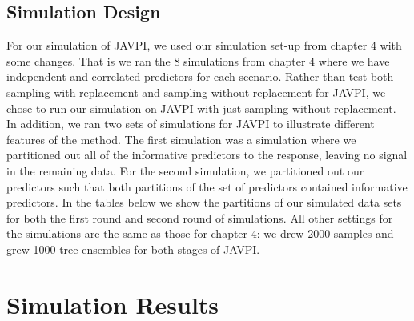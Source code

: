 \documentclass[12pt,twoside]{reedthesis}
\theoremstyle{definition}
\theoremstyle{definition}
\theoremstyle{definition}
\theoremstyle{remark}
\begin{document}
\subsection{Simulation Design}\label{simulation-design-1}
\begin{table}

\caption{\label{tab:unnamed-chunk-26}Partitions for Simulation Runs 1 and 2, respectively}
\centering
{}
\end{table}
For our simulation of JAVPI, we used our simulation set-up from chapter
4 with some changes. That is we ran the 8 simulations from chapter 4
where we have independent and correlated predictors for each scenario.
Rather than test both sampling with replacement and sampling without
replacement for JAVPI, we chose to run our simulation on JAVPI with just
sampling without replacement. In addition, we ran two sets of
simulations for JAVPI to illustrate different features of the method.
The first simulation was a simulation where we partitioned out all of
the informative predictors to the response, leaving no signal in the
remaining data. For the second simulation, we partitioned out our
predictors such that both partitions of the set of predictors contained
informative predictors. In the tables below we show the partitions of
our simulated data sets for both the first round and second round of
simulations. All other settings for the simulations are the same as
those for chapter 4: we drew 2000 samples and grew 1000 tree ensembles
for both stages of JAVPI. \par 

\section{Simulation Results}\label{simulation-results-1}
\end{document}

